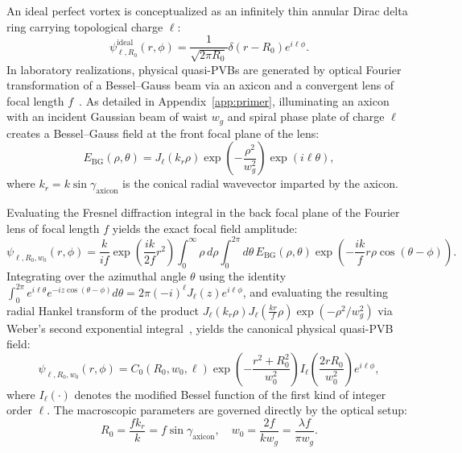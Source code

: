 \documentclass[11pt,a4paper]{article}
\begin{document}
An ideal perfect vortex is conceptualized as an infinitely thin annular Dirac delta ring carrying topological charge $\ell$:
\begin{equation}
\psi_{\ell, R_0}^{\text{ideal}}(r, \phi) = \frac{1}{\sqrt{2\pi R_0}} \delta(r - R_0) e^{i \ell \phi}.
\label{eq:ideal_pvb}
\end{equation}
In laboratory realizations, physical quasi-PVBs are generated by optical Fourier transformation of a Bessel--Gauss beam via an axicon and a convergent lens of focal length $f$~\cite{Vaity2015}. As detailed in Appendix~\ref{app:primer}, illuminating an axicon with an incident Gaussian beam of waist $w_g$ and spiral phase plate of charge $\ell$ creates a Bessel--Gauss field at the front focal plane of the lens:
\begin{equation}
E_{\text{BG}}(\rho, \theta) = J_\ell(k_r \rho) \exp\left( -\frac{\rho^2}{w_g^2} \right) \exp(i \ell \theta),
\label{eq:bg_field}
\end{equation}
where $k_r = k \sin \gamma_{\text{axicon}}$ is the conical radial wavevector imparted by the axicon.

Evaluating the Fresnel diffraction integral in the back focal plane of the Fourier lens of focal length $f$ yields the exact focal field amplitude:
\begin{equation}
\psi_{\ell, R_0, w_0}(r, \phi) = \frac{k}{i f} \exp\left( \frac{i k}{2f} r^2 \right) \int_0^\infty \rho \, d\rho \int_0^{2\pi} d\theta \, E_{\text{BG}}(\rho, \theta) \exp\left( - \frac{i k}{f} r \rho \cos(\theta - \phi) \right).
\label{eq:fresnel_integral_focal}
\end{equation}
Integrating over the azimuthal angle $\theta$ using the identity $\int_0^{2\pi} e^{i \ell \theta} e^{-i z \cos(\theta - \phi)} d\theta = 2\pi (-i)^\ell J_\ell(z) e^{i \ell \phi}$, and evaluating the resulting radial Hankel transform of the product $J_\ell(k_r \rho) J_\ell(\frac{k r}{f} \rho) \exp(-\rho^2 / w_g^2)$ via Weber's second exponential integral~\cite{Gradshteyn2014}, yields the canonical physical quasi-PVB field:
\begin{equation}
\psi_{\ell, R_0, w_0}(r, \phi) = C_0(R_0, w_0, \ell) \exp\left( - \frac{r^2 + R_0^2}{w_0^2} \right) I_\ell\left( \frac{2 r R_0}{w_0^2} \right) e^{i \ell \phi},
\label{eq:pvb_field}
\end{equation}
where $I_\ell(\cdot)$ denotes the modified Bessel function of the first kind of integer order $\ell$. The macroscopic parameters are governed directly by the optical setup:
\begin{equation}
R_0 = \frac{f k_r}{k} = f \sin \gamma_{\text{axicon}}, \quad w_0 = \frac{2 f}{k w_g} = \frac{\lambda f}{\pi w_g}.
\label{eq:r0_w0_parameters}
\end{equation}
\end{document}
